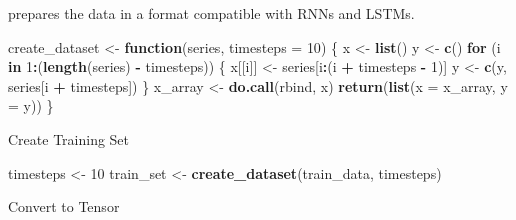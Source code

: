 \documentclass[
]{article}
\newenvironment{Shaded}{\begin{snugshade}}{\end{snugshade}}
\newcommand{\AttributeTok}[1]{\textcolor[rgb]{0.13,0.29,0.53}{#1}}
\newcommand{\CommentTok}[1]{\textcolor[rgb]{0.56,0.35,0.01}{\textit{#1}}}
\newcommand{\ControlFlowTok}[1]{\textcolor[rgb]{0.13,0.29,0.53}{\textbf{#1}}}
\newcommand{\DecValTok}[1]{\textcolor[rgb]{0.00,0.00,0.81}{#1}}
\newcommand{\FunctionTok}[1]{\textcolor[rgb]{0.13,0.29,0.53}{\textbf{#1}}}
\newcommand{\NormalTok}[1]{#1}
\newcommand{\OtherTok}[1]{\textcolor[rgb]{0.56,0.35,0.01}{#1}}
\newcommand{\SpecialCharTok}[1]{\textcolor[rgb]{0.81,0.36,0.00}{\textbf{#1}}}
\newcommand{\StringTok}[1]{\textcolor[rgb]{0.31,0.60,0.02}{#1}}
\begin{document}
prepares the data in a format compatible with RNNs and LSTMs.

\begin{Shaded}
\begin{Highlighting}[]
\NormalTok{create\_dataset }\OtherTok{\textless{}{-}} \ControlFlowTok{function}\NormalTok{(series, }\AttributeTok{timesteps =} \DecValTok{10}\NormalTok{) \{}
\NormalTok{  x }\OtherTok{\textless{}{-}} \FunctionTok{list}\NormalTok{()}
\NormalTok{  y }\OtherTok{\textless{}{-}} \FunctionTok{c}\NormalTok{()}
  \ControlFlowTok{for}\NormalTok{ (i }\ControlFlowTok{in} \DecValTok{1}\SpecialCharTok{:}\NormalTok{(}\FunctionTok{length}\NormalTok{(series) }\SpecialCharTok{{-}}\NormalTok{ timesteps)) \{}
\NormalTok{    x[[i]] }\OtherTok{\textless{}{-}}\NormalTok{ series[i}\SpecialCharTok{:}\NormalTok{(i }\SpecialCharTok{+}\NormalTok{ timesteps }\SpecialCharTok{{-}} \DecValTok{1}\NormalTok{)]}
\NormalTok{    y }\OtherTok{\textless{}{-}} \FunctionTok{c}\NormalTok{(y, series[i }\SpecialCharTok{+}\NormalTok{ timesteps])}
\NormalTok{  \}}
\NormalTok{  x\_array }\OtherTok{\textless{}{-}} \FunctionTok{do.call}\NormalTok{(rbind, x)}
  \FunctionTok{return}\NormalTok{(}\FunctionTok{list}\NormalTok{(}\AttributeTok{x =}\NormalTok{ x\_array, }\AttributeTok{y =}\NormalTok{ y))}
\NormalTok{\}}
\end{Highlighting}
\end{Shaded}

Create Training Set

\begin{Shaded}
\begin{Highlighting}[]
\NormalTok{timesteps }\OtherTok{\textless{}{-}} \DecValTok{10}
\NormalTok{train\_set }\OtherTok{\textless{}{-}} \FunctionTok{create\_dataset}\NormalTok{(train\_data, timesteps)}
\end{Highlighting}
\end{Shaded}

Convert to Tensor

\begin{Shaded}
\end{Shaded}
\end{document}
